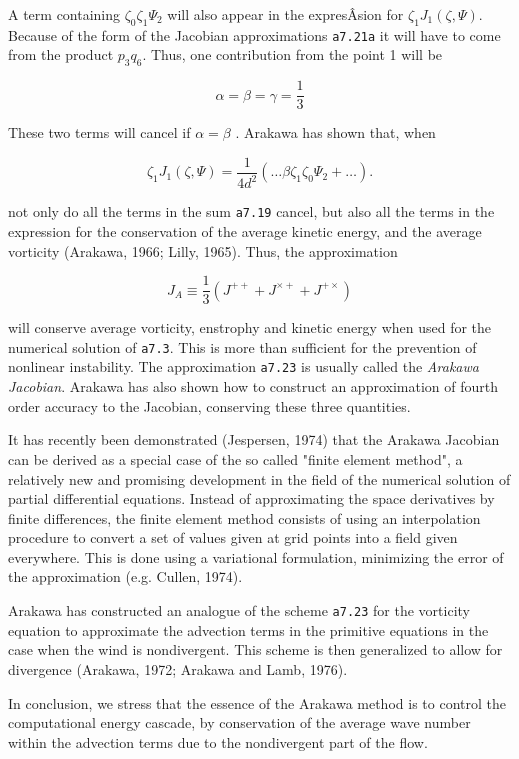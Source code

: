 A term containing \(\zeta_{0}\zeta_{1}\Psi_{2}\) will also appear in the
expresÂ­sion for \(\zeta_{1}J_{1}\left( \zeta,\Psi \right)\). Because of
the form of the Jacobian approximations \texttt{a7.21a} it will have to
come from the product \(p_{3}q_{6}\). Thus, one contribution from the
point 1 will be

\[\alpha = \beta = \gamma = \frac{1}{3}\]

These two terms will cancel if \(\alpha = \beta\) . Arakawa has shown
that, when

\[\zeta_{1}J_{1}\left( \zeta,\Psi \right) = \frac{1}{4d^{2}}\left( \ldots\beta\zeta_{1}\zeta_{0}\Psi_{2} + \ldots \right).\]

not only do all the terms in the sum \texttt{a7.19} cancel, but also all
the terms in the expression for the conservation of the average kinetic
energy, and the average vorticity (Arakawa, 1966; Lilly, 1965). Thus,
the approximation

{\[J_{A} \equiv \frac{1}{3}\left( J^{+ +} + J^{\times +} + J^{+ \times} \right)\]}

will conserve average vorticity, enstrophy and kinetic energy when used
for the numerical solution of \texttt{a7.3}. This is more than
sufficient for the prevention of nonlinear instability. The
approximation \texttt{a7.23} is usually called the \emph{Arakawa
Jacobian}. Arakawa has also shown how to construct an approximation of
fourth order accuracy to the Jacobian, conserving these three
quantities.

It has recently been demonstrated (Jespersen, 1974) that the Arakawa
Jacobian can be derived as a special case of the so called "finite
element method", a relatively new and promising development in the field
of the numerical solution of partial differential equations. Instead of
approximating the space derivatives by finite differences, the finite
element method consists of using an interpolation procedure to convert a
set of values given at grid points into a field given everywhere. This
is done using a variational formulation, minimizing the error of the
approximation (e.g. Cullen, 1974).

Arakawa has constructed an analogue of the scheme \texttt{a7.23} for the
vorticity equation to approximate the advection terms in the primitive
equations in the case when the wind is nondivergent. This scheme is then
generalized to allow for divergence (Arakawa, 1972; Arakawa and Lamb,
1976).

In conclusion, we stress that the essence of the Arakawa method is to
control the computational energy cascade, by conservation of the average
wave number within the advection terms due to the nondivergent part of
the flow.

